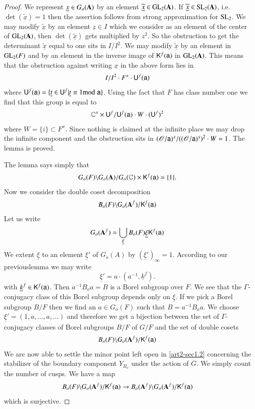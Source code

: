 \begin{proof}
We represent $\underline{x}\in G_{o}(\mathbf{A})$ by an element $\widetilde{\underline{x}}\in \mathrm{GL}_{2}(\mathbf{A})$. If $\widetilde{\underline{x}}\in \mathrm{SL}_{2}(\mathbf{A})$, i.e. $\det(\widetilde{\underline{x}})=1$ then the assertion follows from strong approximation for $\mathrm{SL}_{2}$. We may modify $\widetilde{\underline{x}}$ by an element $\underline{z}\in I$ which we consider as an element of the center of $\mathrm{GL}_{2}(\mathbf{A})$, then $\det(\widetilde{\underline{x}})$ gets multiplied by $z^{2}$. So the obstruction to get the determinant $\widetilde{\underline{x}}$ equal to one sits in $I/I^{2}$. We may modify $\widetilde{\underline{x}}$ by an element in $\mathrm{GL}_{2}(F)$ and by an element in the inverse image of $\mathsf{K}^{f}(\mathsf{a})$ in $\mathrm{GL}_{2}(\mathbf{A})$. This means that the obstruction against writing $\underline{x}$ in the above form lies in
$$
I/I^{2}\cdot F^{x}\cdot \mathsf{U}^{f}(\mathsf{a})
$$
where $\mathsf{U}^{f}(\mathsf{a})=\{\underline{t}\in \mathsf{U}^{f}|\underline{t}\equiv 1{\rm{mod}}\kern.3em \mathsf{a}\}$. Using the fact that $F$ has class number one we find that this group is equal to
$$
\mathbb{C}^{x}\times \mathsf{U}^{f}/\mathsf{U}^{f}(\mathsf{a})\cdot W\cdot (\mathsf{U}^{f})^{2}
$$
where $W=\{i\}\subset F^{x}$. Since nothing is claimed at the infinite place we may drop the infinite component and the obstruction sits in $(\mathscr{O}/\mathsf{a})^{x}/((\mathscr{O}/\mathsf{a})^{x})^{2}\cdot W=1$. The lemma is proved.

The lemma says simply that
$$
G_{o}(F)\backslash G_{o}(\mathbf{A})/G_{o}(\mathbb{C})\times \mathsf{K}^{f}(\mathsf{a})=\{1\}.
$$
Now we consider the double coset decomposition
$$
B_{o}(F)\backslash G_{o}(\mathbf{A}^{f})/\mathsf{K}^{f}(\mathsf{a})
$$
Let us write
$$
G_{o}(\mathbf{A}^{f})=\bigcup\limits_{\underline{\xi}}B_{o}(F)\underline{\xi}\mathsf{K}^{f}(\mathsf{a})
$$
We extent $\underline{\xi}$ to an element $\underline{\xi}'$ of $G_{o}(A)$ by $(\underline{\xi}')_{\infty}=1$. According to our previous\pageoriginale lemma we may write
$$
\underline{\xi}'=a\cdot (a^{-1},\underline{k}^{f}).
$$
with $\underline{k}^{f}\in \mathsf{K}^{f}(\mathsf{a})$. Then $a^{-1}B_{o}a=B$ is a Borel subgroup over $F$. We see that the $\Gamma$-conjugacy class of this Borel subgroup depends only on $\underline{\xi}$. If we pick a Borel subgroup $B/F$ then we find an $a\in G_{o}(F)$ such that $B=a^{-1}B_{o}a$. We choose $\underline{\xi}'=(1,a,\ldots,a,\ldots)$ and therefore we get a bijection between the set of $\Gamma$-conjugacy classes of Borel subgroups $B/F$ of $G/F$ and the set of double cosets
$$
B_{o}(F)\backslash G_{o}(\mathbf{A}^{f})/\mathsf{K}^{f}(\mathsf{a})
$$
We are now able to settle the minor point left open in \ref{art2-sec1.2} concerning the stabilizer of the boundary component $Y_{B_{o}}$ under the action of $\overline{G}$. We simply count the number of cusps. We have a map
$$
B_{o}(F)\backslash G_{o}(\mathbf{A}^{f})/\mathsf{K}^{f}(\mathsf{a})\to B_{o}(\mathbf{A}^{f})\backslash G_{o}(\mathbf{A}^{f})/\mathsf{K}^{f}(\mathsf{a})
$$
which is surjective.


\end{proof}
